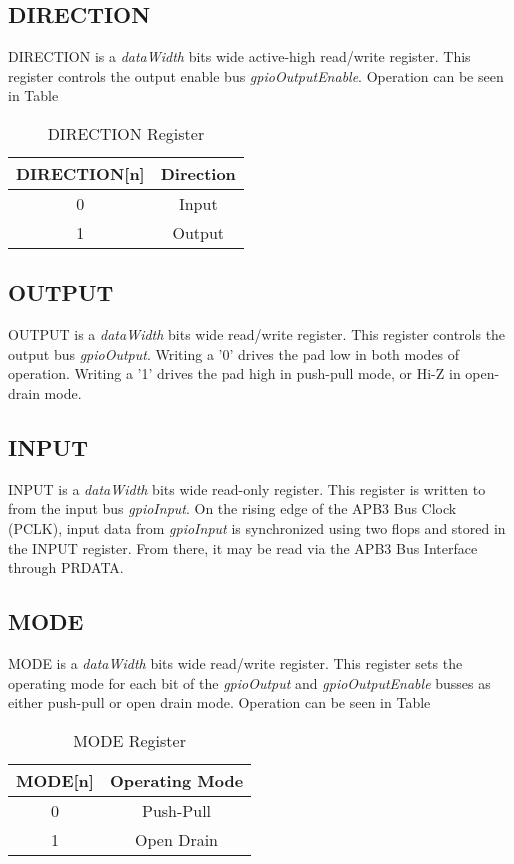   \newpage

  \subsection{DIRECTION}
  DIRECTION is a \textit{dataWidth} bits wide active-high read/write register. This register controls the 
  output enable bus \textit{gpioOutputEnable}. Operation can be seen in Table
  \begin{table}[h]
    \centering
    \begin{tabular}{|c|c|}
        \hline
        \textbf{DIRECTION[n]} & \textbf{Direction} \\ \hline
        0 & Input \\ \hline
        1 & Output \\ \hline
    \end{tabular}
    \caption{DIRECTION Register}
\end{table}

\subsection{OUTPUT}
OUTPUT is a \textit{dataWidth} bits wide read/write register. This register controls the 
output bus \textit{gpioOutput}. Writing a '0' drives the pad low in both modes of operation. Writing a '1' 
drives the pad high in push-pull mode, or Hi-Z in open-drain mode. 

\subsection{INPUT}
INPUT is a \textit{dataWidth} bits wide read-only register. This register is written to from the 
input bus \textit{gpioInput}. On the rising edge of the APB3 Bus Clock (PCLK), input data from \textit{gpioInput} 
is synchronized using two flops and stored in the INPUT register. From there, it may be read via the APB3 Bus Interface
through PRDATA. 

\subsection{MODE}
MODE is a \textit{dataWidth} bits wide read/write register. This register sets the operating mode for each bit
of the \textit{gpioOutput} and \textit{gpioOutputEnable} busses as either push-pull or open drain mode. Operation can be seen in Table
\begin{table}[h]
  \centering
  \begin{tabular}{|c|c|}
      \hline
      \textbf{MODE[n]} & \textbf{Operating Mode} \\ \hline
      0 & Push-Pull \\ \hline
      1 & Open Drain\\ \hline
  \end{tabular}
  \caption{MODE Register}
\end{table}

